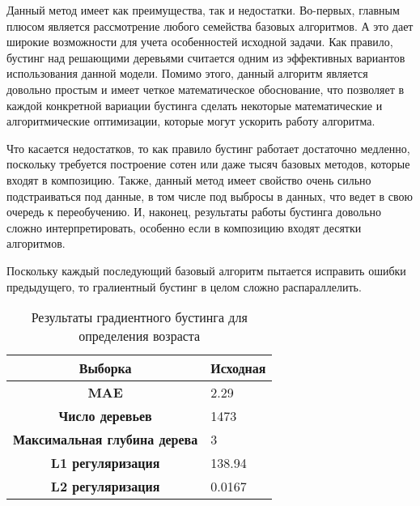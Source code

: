 Данный метод имеет как преимущества, так и недостатки. Во-первых, главным плюсом является рассмотрение любого семейства базовых алгоритмов. А это дает широкие возможности для учета особенностей исходной задачи. Как правило, бустинг над решающими деревьями считается одним из эффективных вариантов использования данной модели. Помимо этого, данный алгоритм является довольно простым и имеет четкое математическое обоснование, что позволяет в каждой конкретной вариации бустинга сделать некоторые математические и алгоритмические оптимизации, которые могут ускорить работу алгоритма.

Что касается недостатков, то  как правило бустинг работает достаточно медленно, поскольку требуется построение сотен или даже тысяч базовых методов, которые входят в композицию. Также, данный метод имеет свойство очень сильно подстраиваться под данные, в том числе под выбросы в данных, что ведет в свою очередь к переобучению. И, наконец, результаты работы бустинга довольно сложно интерпретировать, особенно
если в композицию входят десятки алгоритмов. 

Поскольку каждый последующий базовый алгоритм пытается исправить ошибки предыдущего, то гралиентный бустинг в целом сложно распараллелить.


\setlength\extrarowheight{8pt}
\begin{table}[t]
\centering
\begin{tabular}{|c|l|}
\hline
\textbf{Выборка}            & Исходная \\ \hline
\textbf{MAE}                & 2.29  \\ \hline
\textbf{Число деревьев}      & 1473     \\ \hline
\textbf{Максимальная глубина дерева}         & 3        \\ \hline
\textbf{L1 регуляризация}         & 138.94   \\ \hline
\textbf{L2 регуляризация}        & 0.0167   \\ \hline
\end{tabular}
\caption{Результаты градиентного бустинга для определения возраста}
\label{gradient boosting age table}
\end{table}

